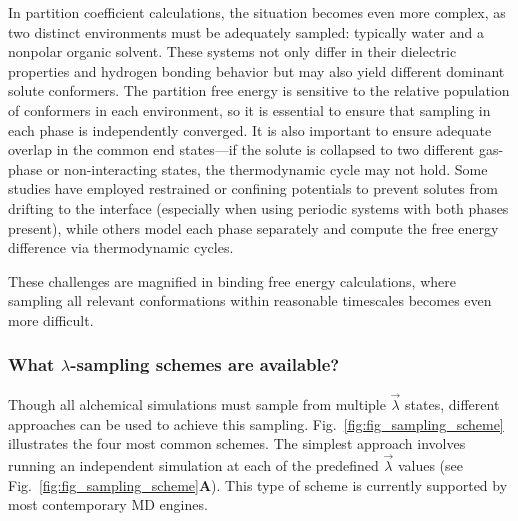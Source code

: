 \documentclass[9pt,bestpractices]{livecoms}
\begin{document}
In partition coefficient calculations, the situation becomes even more complex, as two distinct environments must be adequately sampled: typically water and a nonpolar organic solvent. These systems not only differ in their dielectric properties and hydrogen bonding behavior but may also yield different dominant solute conformers. The partition free energy is sensitive to the relative population of conformers in each environment, so it is essential to ensure that sampling in each phase is independently converged. It is also important to ensure adequate overlap in the common end states—if the solute is collapsed to two different gas-phase or non-interacting states, the thermodynamic cycle may not hold\cite{fan2021sampl7}. Some studies have employed restrained or confining potentials to prevent solutes from drifting to the interface (especially when using periodic systems with both phases present), while others model each phase separately and compute the free energy difference via thermodynamic cycles\cite{turchi2019,bannan2016,petris2021}.

These challenges are magnified in binding free energy calculations, where sampling all relevant conformations within reasonable timescales becomes even more difficult.

\subsubsection{What $\lambda$-sampling schemes are available?}
\label{sec:sampling_schemes}
Though all alchemical simulations must sample from multiple $\vec{\lambda}$ states, different approaches can be used to achieve this sampling. Fig.~\ref{fig:fig_sampling_scheme} illustrates the four most common schemes. The simplest approach involves running an independent simulation at each of the predefined $\vec{\lambda}$ values (see Fig.~\ref{fig:fig_sampling_scheme}\textbf{A}). This type of scheme is currently supported by most contemporary MD engines.
\end{document}
